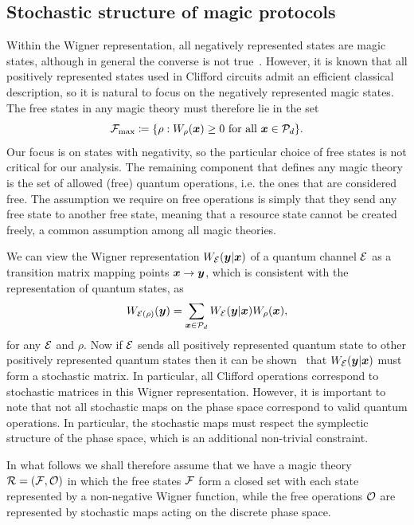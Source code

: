 \documentclass[pra,
aps,
twocolumn,
superscriptaddress,
groupedaddress,
nofootinbib,
reprint
]{revtex4-1}
\begin{document}

\subsection{Stochastic structure of magic protocols}
\label{sec:struc}

Within the Wigner representation, all negatively represented states are magic states, although in general the converse is not true~\cite{cit:campbell}. However, it is known that all positively represented states used in Clifford circuits admit an efficient classical description, so it is natural to focus on the negatively represented magic states. The free states in any magic theory must therefore lie in the set
\begin{equation}
    \Fmax \coloneqq \{ \rho: \W[\bmx]{\rho} \geq 0 \text{ for all } \bmx \in \cal{P}_d\}.
\end{equation}
Our focus is on states with negativity, so the particular choice of free states is not critical for our analysis. The remaining component that defines any magic theory is the set of allowed (free) quantum operations, i.e. the ones that are considered free. The assumption we require on free operations is simply that they send any free state to another free state, meaning that a resource state cannot be created freely, a common assumption among all magic theories.

We can view the Wigner representation $W_{\mathcal{E}}( \boldsymbol{y} | \boldsymbol{x})$ of a quantum channel $\mathcal{E}$ as a transition matrix mapping points $\boldsymbol{x} \rightarrow \boldsymbol{y}$, which is consistent with the representation of quantum states, as
\begin{equation}
	W_{\mathcal{E}(\rho)} (\boldsymbol{y}) = \sum_{\boldsymbol{x} \in {\mathcal P}_d} W_{\mathcal{E}}( \boldsymbol{y} | \boldsymbol{x}) W_\rho(\boldsymbol{x}),
\end{equation}
for any $\mathcal{E}$ and $\rho$. Now if $\mathcal{E}$ sends all positively represented quantum state to other positively represented quantum states then it can be shown~\cite{Wang_2019} that $W_{\mathcal{E}}(\boldsymbol{y} |\boldsymbol{x})$ must form a stochastic matrix. In particular, all Clifford operations correspond to stochastic matrices in this Wigner representation. However, it is important to note that not all stochastic maps on the phase space correspond to valid quantum operations. In particular, the stochastic maps must respect the symplectic structure of the phase space, which is an additional non-trivial constraint.

In what follows we shall therefore assume that we have a magic theory $\mathcal{R} = (\mathcal{F}, \mathcal{O})$ in which the free states $\mathcal{F}$ form a closed set with each state represented by a non-negative Wigner function, while the free operations $\mathcal{O}$ are represented by stochastic maps acting on the discrete phase space.
\end{document}
